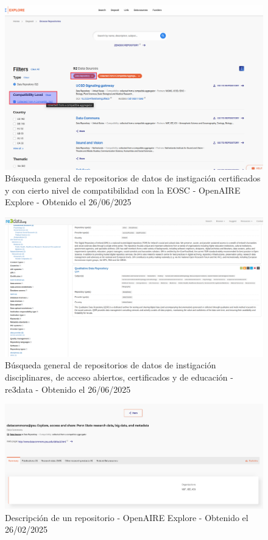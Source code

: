 \documentclass[runningheads]{llncs}
\def \bchgon {\begin{color}{blue}}
\def \echgon {\end{color}}
\begin{document}
\begin{figure}
    \centering
    \includegraphics[width=0.5\linewidth]{img/openaire_gral_search.png}
    \caption{
Búsqueda general de repositorios de datos de instigación certificados y con cierto nivel de compatibilidad con la EOSC - OpenAIRE Explore - Obtenido el 26/06/2025
    }
    \label{fig:openaire_gral_search}
\end{figure}

\begin{figure}
    \centering
    \includegraphics[width=0.5\linewidth]{img/re3data_busqueda_general.png}
    \caption{
Búsqueda general de repositorios de datos de instigación disciplinares, de acceso abiertos, certificados y de educación - re3data - Obtenido el 26/06/2025
    }
    \label{fig:re3data_busqueda_general}
\end{figure}

\begin{figure}
    \centering
    \includegraphics[width=0.5\linewidth]{img/repositorio_openaire.png}
    \caption{Descripción de un repositorio - OpenAIRE Explore - Obtenido el 26/02/2025}
    \label{fig:repositorio_openaire}
\end{figure}

\end{document}
